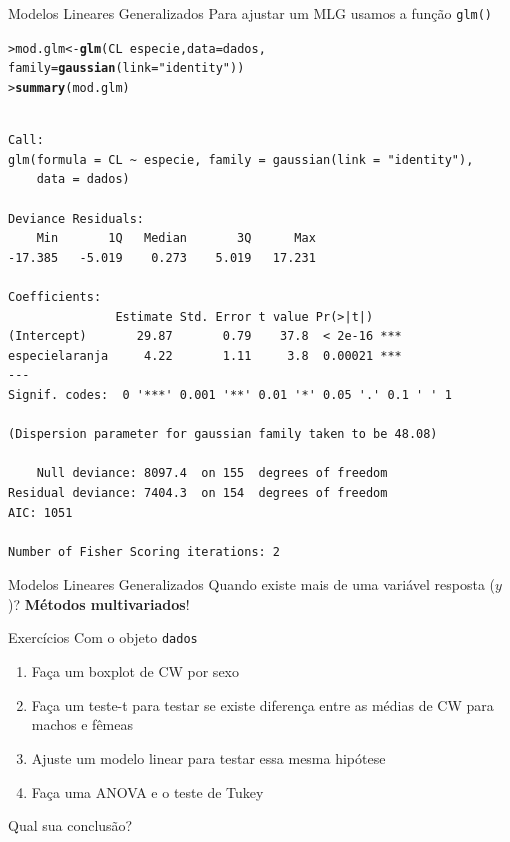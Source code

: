 \documentclass[10pt]{beamer}\usepackage{graphicx, color}
\makeatletter
\newcommand{\hlfunctioncall}[1]{\textcolor[rgb]{0,0,0.545098039215686}{\textbf{#1}}}%
\newcommand{\hlstring}[1]{\textcolor[rgb]{0.282352941176471,0.23921568627451,0.545098039215686}{#1}}%
\newenvironment{kframe}{%
 \def\at@end@of@kframe{}%
 \ifinner\ifhmode%
  \def\at@end@of@kframe{\end{minipage}}%
  \begin{minipage}{\columnwidth}%
 \fi\fi%
 \def\FrameCommand##1{\hskip\@totalleftmargin \hskip-\fboxsep
 \colorbox{shadecolor}{##1}\hskip-\fboxsep
     \hskip-\linewidth \hskip-\@totalleftmargin \hskip\columnwidth}%
 \MakeFramed {\advance\hsize-\width
   \@totalleftmargin\z@ \linewidth\hsize
   \@setminipage}}%
 {\par\unskip\endMakeFramed%
 \at@end@of@kframe}
\newenvironment{knitrout}{}{} %
\makeatother
\begin{document}
\begin{frame}[fragile=singleslide]{Modelos Lineares Generalizados}
Para ajustar um MLG usamos a função \texttt{glm()}
\begin{knitrout}\footnotesize
{}\color{fgcolor}\begin{kframe}
\begin{alltt}
> mod.glm <- \hlfunctioncall{glm}(CL ~ especie, data = dados,
                 family = \hlfunctioncall{gaussian}(link = \hlstring{"identity"}))
> \hlfunctioncall{summary}(mod.glm)
\end{alltt}
\begin{verbatim}

Call:
glm(formula = CL ~ especie, family = gaussian(link = "identity"), 
    data = dados)

Deviance Residuals: 
    Min       1Q   Median       3Q      Max  
-17.385   -5.019    0.273    5.019   17.231  

Coefficients:
               Estimate Std. Error t value Pr(>|t|)    
(Intercept)       29.87       0.79    37.8  < 2e-16 ***
especielaranja     4.22       1.11     3.8  0.00021 ***
---
Signif. codes:  0 '***' 0.001 '**' 0.01 '*' 0.05 '.' 0.1 ' ' 1 

(Dispersion parameter for gaussian family taken to be 48.08)

    Null deviance: 8097.4  on 155  degrees of freedom
Residual deviance: 7404.3  on 154  degrees of freedom
AIC: 1051

Number of Fisher Scoring iterations: 2

\end{verbatim}
\end{kframe}
\end{knitrout}

\end{frame}

\begin{frame}[fragile=singleslide]{Modelos Lineares Generalizados}
Quando existe mais de uma variável resposta ($y$)? \textbf{Métodos
  multivariados}!
\end{frame}

\begin{frame}[fragile=singleslide]{Exercícios}
Com o objeto \texttt{dados}
\begin{enumerate}
\item Faça um boxplot de CW por sexo
\item Faça um teste-t para testar se existe diferença entre as médias de
  CW para machos e fêmeas
\item Ajuste um modelo linear para testar essa mesma hipótese
\item Faça uma ANOVA e o teste de Tukey
\end{enumerate}
Qual sua conclusão?
\end{frame}
\end{document}

